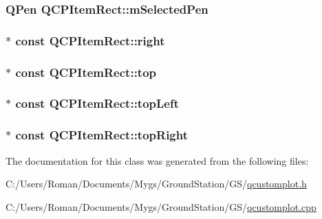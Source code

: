 \subsubsection[{m\+Selected\+Pen}]{\setlength{\rightskip}{0pt plus 5cm}Q\+Pen Q\+C\+P\+Item\+Rect\+::m\+Selected\+Pen\hspace{0.3cm}{\ttfamily [protected]}}\label{class_q_c_p_item_rect_a73cc0bee61de3c67221ec8c7a76a29ed}
\hypertarget{class_q_c_p_item_rect_a7979c1915f61ad2609a9cc179c2e445e}{}
\subsubsection[{right}]{$\ast$ const Q\+C\+P\+Item\+Rect\+::right}\label{class_q_c_p_item_rect_a7979c1915f61ad2609a9cc179c2e445e}
\hypertarget{class_q_c_p_item_rect_a96e50db552fb297d6fb62614676217bc}{}
\subsubsection[{top}]{$\ast$ const Q\+C\+P\+Item\+Rect\+::top}\label{class_q_c_p_item_rect_a96e50db552fb297d6fb62614676217bc}
\hypertarget{class_q_c_p_item_rect_aa70feeef173489b03c3fbe906a5023c4}{}
\subsubsection[{top\+Left}]{$\ast$ const Q\+C\+P\+Item\+Rect\+::top\+Left}\label{class_q_c_p_item_rect_aa70feeef173489b03c3fbe906a5023c4}
\hypertarget{class_q_c_p_item_rect_a77e0eb6e4aa6efee620d35e2c21bdad7}{}
\subsubsection[{top\+Right}]{$\ast$ const Q\+C\+P\+Item\+Rect\+::top\+Right}\label{class_q_c_p_item_rect_a77e0eb6e4aa6efee620d35e2c21bdad7}


The documentation for this class was generated from the following files\+:\begin{DoxyCompactItemize}
\item 
C\+:/\+Users/\+Roman/\+Documents/\+Mygs/\+Ground\+Station/\+G\+S/\hyperlink{qcustomplot_8h}{qcustomplot.\+h}\item 
C\+:/\+Users/\+Roman/\+Documents/\+Mygs/\+Ground\+Station/\+G\+S/\hyperlink{qcustomplot_8cpp}{qcustomplot.\+cpp}\end{DoxyCompactItemize}
